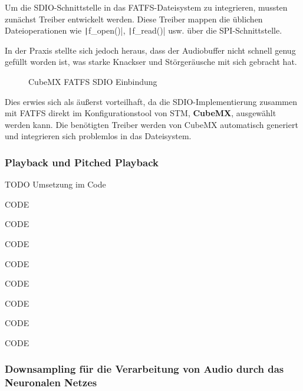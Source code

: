 Um die SDIO-Schnittstelle in das FATFS-Dateisystem zu integrieren, mussten zunächst Treiber entwickelt werden. Diese Treiber mappen die üblichen Dateioperationen wie \texttt|f_open()|, \texttt|f_read()| usw. über die SPI-Schnittstelle.


In der Praxis stellte sich jedoch heraus, dass der Audiobuffer nicht schnell genug gefüllt worden ist, was starke Knackser und Störgeräusche mit sich gebracht hat.

\begin{figure} %
	\vspace{-30pt + 0.02\textwidth}
	\hspace{0.02\textwidth} %
	\caption{CubeMX FATFS SDIO Einbindung}
	\label{fig:cubemx_sdio}
\end{figure}

Dies erwies sich als äußerst vorteilhaft, da die SDIO-Implementierung zusammen mit FATFS direkt im Konfigurationstool von STM, \textbf{CubeMX}, ausgewählt werden kann. Die benötigten Treiber werden von CubeMX automatisch generiert und integrieren sich problemlos in das Dateisystem.

\subsubsection{Playback und Pitched Playback}


TODO Umsetzung im Code

CODE 

CODE 

CODE 

CODE 

CODE 

CODE 

CODE

CODE 


\subsubsection{Downsampling für die Verarbeitung von Audio durch das Neuronalen Netzes}


